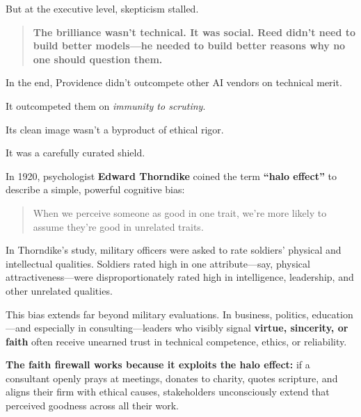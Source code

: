 But at the executive level, skepticism stalled.

\begin{quote}
\textbf{The brilliance wasn’t technical. It was social. Reed didn’t need to build better models—he needed to build better reasons why no one should question them.}
\end{quote}

In the end, Providence didn’t outcompete other AI vendors on technical merit.

It outcompeted them on \textit{immunity to scrutiny}.

Its clean image wasn’t a byproduct of ethical rigor.

It was a carefully curated shield.

\medskip

\begin{tcolorbox}[colback=blue!5!white, colframe=blue!50!black, breakable,
    title={Psychological Sidebar: The Halo Effect — When Virtue in One Domain Shields Vice in Another}]
  
  In 1920, psychologist \textbf{Edward Thorndike} coined the term \textbf{“halo effect”} to describe a simple, powerful cognitive bias:
  
  \begin{quote}
  When we perceive someone as good in one trait, we’re more likely to assume they’re good in unrelated traits.
  \end{quote}
  
  In Thorndike’s study, military officers were asked to rate soldiers’ physical and intellectual qualities. Soldiers rated high in one attribute—say, physical attractiveness—were disproportionately rated high in intelligence, leadership, and other unrelated qualities.
  
  \medskip
  
  This bias extends far beyond military evaluations. In business, politics, education—and especially in consulting—leaders who visibly signal \textbf{virtue, sincerity, or faith} often receive unearned trust in technical competence, ethics, or reliability.
  
  \medskip
  
  \textbf{The faith firewall works because it exploits the halo effect:} if a consultant openly prays at meetings, donates to charity, quotes scripture, and aligns their firm with ethical causes, stakeholders unconsciously extend that perceived goodness across all their work.
  
  \medskip
  

\end{tcolorbox}
